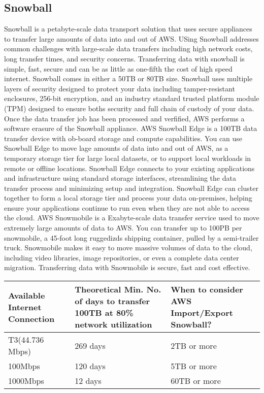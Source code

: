 \documentclass{article}
\begin{document}
	\subsection{Snowball}
	Snowball is a petabyte-scale data transport solution that uses secure appliances to transfer large amounts of data into and out of AWS. USing Snowball addresses common challenges with large-scale data transfers including high network costs, long transfer times, and security concerns.  Transferring data with snowball is simple, fast, secure and can be as little as one-fifth the cost of high speed internet. Snowball comes in either a 50TB or 80TB size. Snowball uses multiple layers of security designed to protect your data including tamper-resistant enclosures, 256-bit encryption, and an industry standard trusted platform module (TPM) designed to ensure boths security and full chain of custody of your data. Once the data transfer job has been processed and verfified, AWS performs a software erasure of the Snowball appliance. AWS Snowball Edge is a 100TB data transfer device with ob-board storage and compute capabilities. You can use Snowball Edge to move lage amounts of data into and out of AWS, as a temporary storage tier for large local datasets, or to support local workloads in remote or offline locations.  Snowball Edge connects to your existing applications and infrastructure using standard storage interfaces, streamlining the data transfer process and minimizing setup and integration. Snowball Edge can cluster together to form a local storage tier and process your data on-premises, helping ensure your applications continue to run even when they are not able to access the cloud. AWS Snowmobile is a Exabyte-scale data transfer service used to move extremely large amounts of data to AWS. You can transfer up to 100PB per snowmobile, a 45-foot long ruggedizds shipping container, pulled by a semi-trailer truck. Snowmobile makes it easy to move massive volumes of data to the cloud, including video libraries, image repositories, or even a complete data center migration. Transferring data with Snowmobile is secure, fast and cost effective.
	
	\begin{center}
		\begin{tabular}{ |p{3cm}|p{3cm}|p{3cm}|}		
		\hline
		Available Internet Connection & Theoretical Min. No. of days to transfer 100TB at 80\% network utilization & When to consider AWS Import/Export Snowball? \\
	 	\hline
	 	T3(44.736 Mbps) & 269 days & 2TB or more \\ 
	 	100Mbps & 120 days & 5TB or more \\ 
	 	1000Mbps & 12 days & 60TB or more \\ 
	 	\hline
		\end{tabular}
	\end{center}
	
\end{document}
